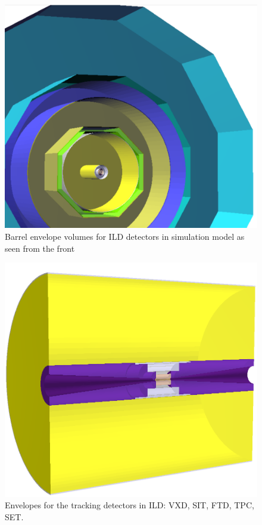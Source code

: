 \documentclass[a4paper]{article}
\begin{document}
\begin{figure}[th]
  \centering
  \includegraphics[width=\columnwidth]{ILD_envelopes_3d_front}
  \caption{Barrel envelope volumes for ILD detectors in simulation model as seen from the front}
  \label{ild:fig:rphi_envelopes}
\end{figure}

\begin{figure}[th]
  \centering
  \includegraphics[width=\columnwidth]{tracking_envelopes}
  \caption{Envelopes for the tracking detectors in ILD: VXD, SIT, FTD, TPC, SET.}
  \label{ild:fig:trk_envelopes}
\end{figure}
\end{document}

